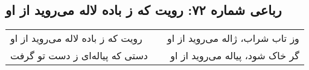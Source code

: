 \begin{center}
\section*{رباعی شماره ۷۲: رویت که ز باده لاله می‌روید از او}
\label{sec:072}
\begin{longtable}{l p{0.5cm} r}
رویت که ز باده لاله می‌روید از او
&&
وز تاب شراب، ژاله می‌روید از او
\\
دستی که پیاله‌ای ز دست تو گرفت
&&
گر خاک شود، پیاله می‌روید از او
\\
\end{longtable}
\end{center}
